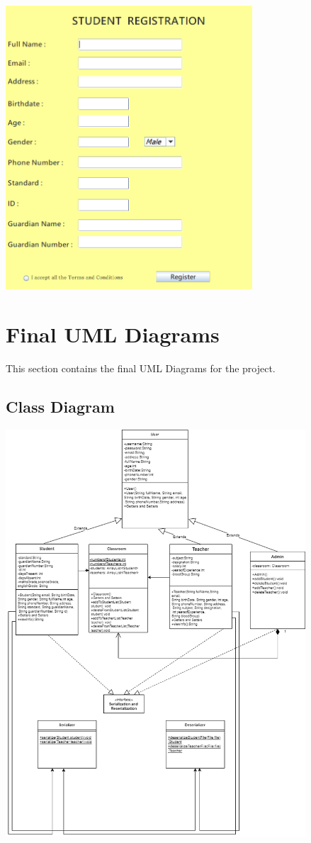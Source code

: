\documentclass[a4paper,12pt]{article}
\begin{document}
\begin{center}
\\
\includegraphics[width=9.2cm]{5.png} 
\end{center}
\newpage

\section{Final UML Diagrams}
This section contains the final UML Diagrams for the project.
\subsection{Class Diagram}
\begin{center}
\includegraphics[width=11.2cm]{7.png} 
\end{center}
\newpage
\end{document}
